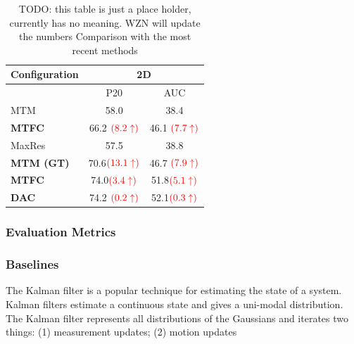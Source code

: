 \documentclass[10pt,twocolumn,letterpaper]{article}
\begin{document}
\begin{table}[t]
\small
   \centering
        \begin{tabular}{|l|| *{2}{c}|}\hline
            {\small Configuration} & \multicolumn{2}{|c|}{\small 2D}    \\ \hline \hline
                                                  & P20       & AUC   \\ \hline \hline

            {\small MTM }                          &  58.0     &  38.4      \\
            \hline
            {\small \textbf{MTFC} }  &  66.2 ${\color{red}(8.2\uparrow)}$    &  46.1 ${\color{red}(7.7\uparrow)}$  \\
            \hline
            \hline
            {\small MaxRes }                        &  57.5     &  38.8   \\
            \hline
            {\small \textbf{MTM (GT)} }        &  70.6${\color{red}(13.1\uparrow)}$     &  46.7  ${\color{red}(7.9\uparrow)}$   \\
            \hline
            \hline
            {\small \textbf{MTFC}}           &  74.0${\color{red}(3.4\uparrow)}$      &  51.8${\color{red}(5.1\uparrow)}$     \\
            \hline
            {\small \textbf{DAC}}&  74.2 ${\color{red}(0.2\uparrow)}$    &  52.1${\color{red}(0.3\uparrow)}$    \\\hline

        \end{tabular}

    \caption{ {\small
    TODO: this table is just a place holder, currently has no meaning. WZN will update the numbers
          Comparison with the most recent methods }
          } \label{table_baseline2}
\end{table}
\subsubsection{Evaluation Metrics}


\subsubsection{Baselines}
The Kalman filter is a popular technique for estimating the state of a system. Kalman filters estimate a continuous state and gives a uni-modal distribution. The Kalman filter represents all distributions of the Gaussians and iterates two things: (1) measurement updates; (2) motion updates
\end{document}
